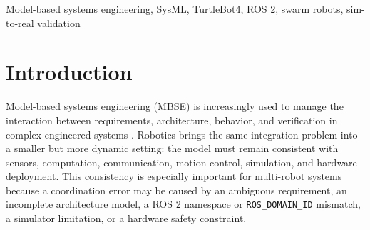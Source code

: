 \documentclass{ieeeaccess}
\begin{document}
\begin{abstract}
Multi-robot applications are difficult to validate when system models, simulation assets, and robot software evolve separately. This paper presents a model-based systems engineering (MBSE) workflow that connects SysML artifacts to an executable ROS 2 implementation for a two-TurtleBot4 target-acquisition mission. The workflow defines requirements, behavioral views, software architecture, hardware architecture, and data-flow views, then maps them to ROS 2 nodes, topics, launch files, DDS network settings, and validation metrics. The implemented case study uses exactly two canonical robot identities, \texttt{/robot1} and \texttt{/robot2}, while the physical TurtleBot4 Lite deployment boundary records the required FastDDS, \texttt{ROS\_DOMAIN\_ID}, Simple Discovery, and \texttt{/cmd\_vel\_unstamped} interfaces. A coordinator assigns \texttt{/robot1} as leader, assigns \texttt{/robot2} a dynamic follower pose behind the leader, publishes observable task state and events, and records the result in CSV metrics. Fifteen stable Gazebo simulation trials over five target positions on the saved lab occupancy map completed successfully, with a mean completion time of 7.603 s, no role switches, and a minimum observed inter-robot separation of 0.321 m. A physical deployment check confirmed the canonical odometry and command interfaces while identifying lidar scan streaming as a remaining deployment issue. The contribution is not a general swarm benchmark, but a traceable sim-to-real workflow whose scope is deliberately aligned with the available two-robot platform.
\end{abstract}

\begin{keywords}
Model-based systems engineering, SysML, TurtleBot4, ROS 2, swarm robots, sim-to-real validation
\end{keywords}

\titlepgskip=-21pt

\maketitle

\section{Introduction}
Model-based systems engineering (MBSE) is increasingly used to manage the interaction between requirements, architecture, behavior, and verification in complex engineered systems \cite{Sannes2022,Zihang2024}. Robotics brings the same integration problem into a smaller but more dynamic setting: the model must remain consistent with sensors, computation, communication, motion control, simulation, and hardware deployment. This consistency is especially important for multi-robot systems because a coordination error may be caused by an ambiguous requirement, an incomplete architecture model, a ROS 2 namespace or \texttt{ROS\_DOMAIN\_ID} mismatch, a simulator limitation, or a hardware safety constraint.
\end{document}
